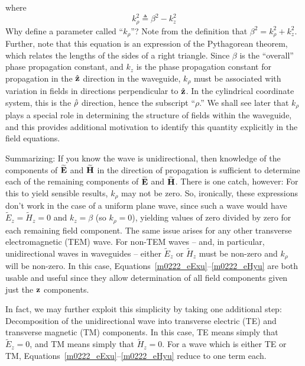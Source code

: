 %
where 
%
\begin{equation}
k_{\rho}^2 \triangleq \beta^2 - k_z^2
\end{equation}
%
Why define a parameter called ``$k_{\rho}$''?  
Note from the definition that $\beta^2 = k_{\rho}^2 + k_z^2$.  
Further, note that this equation is an expression of the Pythagorean theorem, which relates the lengths of the sides of a right triangle.
Since $\beta$ is the ``overall'' phase propagation constant, and $k_z$ is the phase propagation constant for propagation in the $\hat{\bf z}$ direction in the waveguide, $k_{\rho}$ must be associated with variation in fields in directions perpendicular to $\hat{\bf z}$.  In the cylindrical coordinate system, this is the $\hat{\bf \rho}$ direction, hence the subscript ``$\rho$.''
We shall see later that $k_{\rho}$ plays a special role in determining the structure of fields within the waveguide, and this provides additional motivation to identify this quantity explicitly in the field equations.

Summarizing: If you know the wave is unidirectional, then knowledge of the components of $\widetilde{\bf E}$ and $\widetilde{\bf H}$ in the direction of propagation is sufficient to determine each of the remaining components of $\widetilde{\bf E}$ and $\widetilde{\bf H}$.  There is one catch, however:  For this to yield sensible results, $k_{\rho}$ may not be zero. So, ironically, these expressions don't work in the case of a uniform plane wave, since such a wave would have $\widetilde{E}_z=\widetilde{H}_z=0$ and $k_z=\beta$ (so $k_{\rho}=0$), yielding values of zero divided by zero for each remaining field component.  The same issue arises for any other transverse electromagnetic (TEM) 
wave.  
For non-TEM waves -- and, in particular, unidirectional waves in waveguides -- 
either $\widetilde{E}_z$ or $\widetilde{H}_z$ must be non-zero and $k_{\rho}$ will be non-zero.  In this case, Equations~\ref{m0222_eExu}--\ref{m0222_eHyu} are both usable and useful since they allow determination of all field components given just the ${\bf z}$ components.  

In fact, we may further exploit this simplicity by taking one additional step: 
Decomposition of the unidirectional wave into transverse electric (TE) 
and transverse magnetic (TM) 
components. %
In this case, 
TE means simply that $\widetilde{E}_z=0$, and
TM means simply that $\widetilde{H}_z=0$.
For a wave which is either TE or TM, Equations~\ref{m0222_eExu}--\ref{m0222_eHyu} reduce to one term each.



